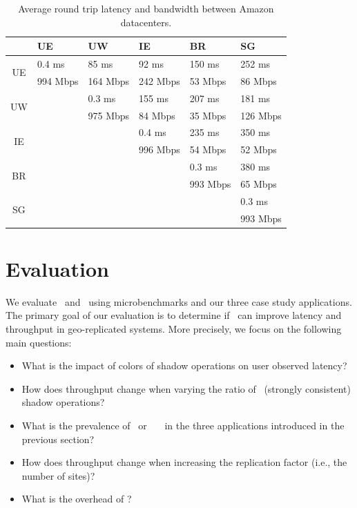 \begin{table}[!ht]
\centering
 \begin{tabular}{c|l|l|l|l|l|}
 & UE & UW & IE & BR & SG \\
\hline
\multirow{2}{*}{UE} &  0.4 ms  & 85 ms    & 92 ms    & 150 ms &  252 ms\\
   &  994 Mbps& 164 Mbps & 242 Mbps & 53 Mbps & 86 Mbps\\
\hline
\multirow{2}{*}{UW} &          & 0.3 ms   & 155 ms   & 207 ms  & 181 ms \\
   &          & 975 Mbps & 84 Mbps  & 35 Mbps & 126 Mbps \\
\hline
\multirow{2}{*}{IE} &          &          & 0.4 ms   & 235 ms  & 350 ms  \\
   &          &          & 996 Mbps & 54 Mbps & 52 Mbps \\
\hline
\multirow{2}{*}{BR} &          &          &          & 0.3 ms  & 380 ms \\
   &          &          &          & 993 Mbps& 65 Mbps \\
\hline
\multirow{2}{*}{SG} &          &          &          &         & 0.3 ms\\
   &          &          &          &         & 993 Mbps\\
\hline
\end{tabular}
\caption{Average round trip latency and bandwidth between Amazon datacenters.}
\label{tab:roundtriplatency}
\end{table}

\section{Evaluation}
\label{ch:redblue:sect:eval}
We evaluate \gemini\ and \RBc\ using microbenchmarks and
our three case study applications.  The primary goal of our evaluation
is to determine if \RBc\ can improve latency and throughput in
geo-replicated systems. More precisely, we focus on the following
main questions:

\begin{itemize}
\item What is the impact of colors of shadow operations on user observed latency?
\item How does throughput change when varying the ratio of \red\ (strongly
consistent) shadow operations?
\item What is the prevalence of \blue\ or \red\ \shadow\ \operations\ in the three applications introduced
in the previous section?
\item How does throughput change when increasing the replication factor (i.e., the number of sites)?
\item What is the overhead of \gemini?
\end{itemize} 

